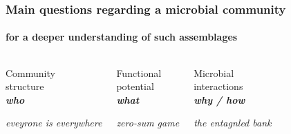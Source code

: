 \documentclass{beamer}
\begin{document}
   \begin{frame}
      \frametitle{Main questions regarding a microbial community}
      \framesubtitle{for a deeper understanding of such assemblages}
      \begin{singlespace}


         \begin{columns}[onlytextwidth]
            

               \begin{center}

                  Community \\ structure   \\ \textbf{\textit{who}}  

                  \hrulefill

                  \scriptsize \textit{eveyrone is everywhere}

               \end{center}



               \begin{center}

                  Functional \\ potential \\ \textbf{\textit{what}}

                  \hrulefill

                  \scriptsize \textit{zero-sum game}

               \end{center}


               \begin{center}

                  Microbial \\ interactions \\ \textbf{\textit{why / how}}

                  \hrulefill

                  \scriptsize \textit{the entagnled bank}

               \end{center}
      

         \end{columns}



      \end{singlespace}

   \end{frame}
\end{document}
